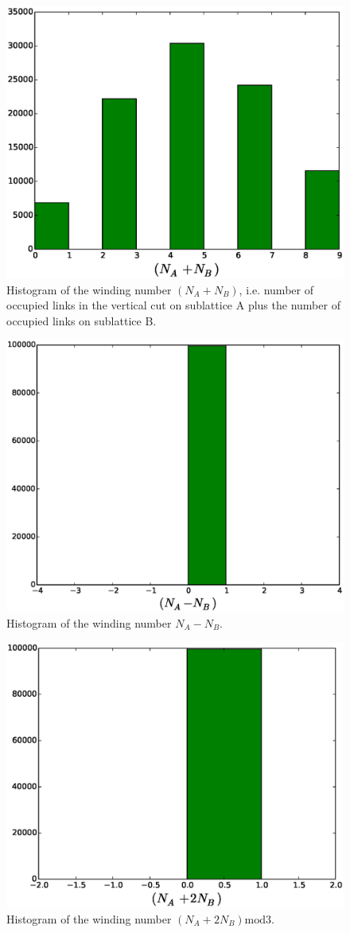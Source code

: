 \documentclass[aps,floatfix,11pt]{revtex4-1}
\begin{document}
\begin{figure}[h]
    \centering
    \includegraphics[width=8.5 cm]{W_vrt_NApNB_no_mod_dmr_dmr_mdl}
    \caption{Histogram of the winding number $(N_A + N_B)$, i.e. number of occupied links in the
    vertical cut on sublattice A plus the number of occupied links on sublattice B.\label{}}
\end{figure}


\begin{figure}[h]
    \centering
    \includegraphics[width=8.5 cm]{W_vrt_NAmNB_dmr_dmr_mdl}
    \caption{Histogram of the winding number $N_A - N_B$.\label{}}
\end{figure}

\begin{figure}[h]
    \centering
    \includegraphics[width=8.5 cm]{W_vrt_NAp2NB_dmr_dmr_mdl}
    \caption{Histogram of the winding number $(N_A + 2N_B)\mathrm{mod}3$.\label{}}
\end{figure}
\end{document}
